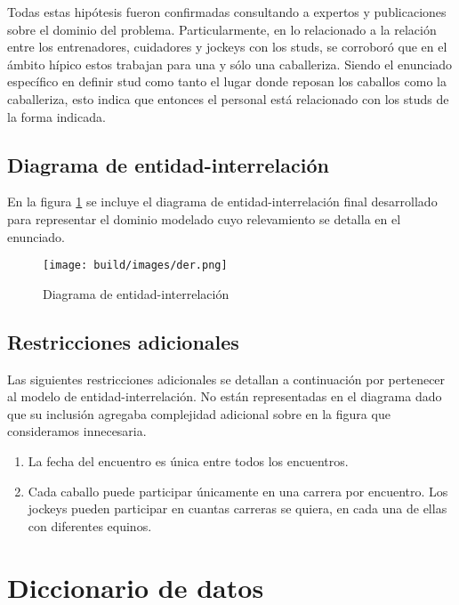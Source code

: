 \documentclass[a4paper,11pt]{article}
\begin{document}
Todas estas hipótesis fueron confirmadas consultando a expertos y publicaciones
sobre el dominio del problema. Particularmente, en lo relacionado a la relación
entre los entrenadores, cuidadores y jockeys con los studs, se corroboró que en
el ámbito hípico estos trabajan para una y sólo una caballeriza. Siendo el
enunciado específico en definir stud como tanto el lugar donde reposan los
caballos como la caballeriza, esto indica que entonces el personal está
relacionado con los studs de la forma indicada.

\subsection{Diagrama de entidad-interrelación}

En la figura \ref{fig:der} se incluye el diagrama de entidad-interrelación
final desarrollado para representar el dominio modelado cuyo relevamiento se
detalla en el enunciado.

\begin{figure}[h!t]
  \centering
  \texttt{[image: build/images/der.png]}
  \caption{Diagrama de entidad-interrelación} \label{fig:der}
\end{figure}

\FloatBarrier

\subsection{Restricciones adicionales}

Las siguientes restricciones adicionales se detallan a continuación por
pertenecer al modelo de entidad-interrelación. No están representadas en el
diagrama dado que su inclusión agregaba complejidad adicional sobre en la
figura que consideramos innecesaria.

\begin{enumerate}

  \item La fecha del encuentro es única entre todos los encuentros.

  \item Cada caballo puede participar únicamente en una carrera por encuentro.
    Los jockeys pueden participar en cuantas carreras se quiera, en cada una de
    ellas con diferentes equinos.

\end{enumerate}

\section{Diccionario de datos}
\end{document}
